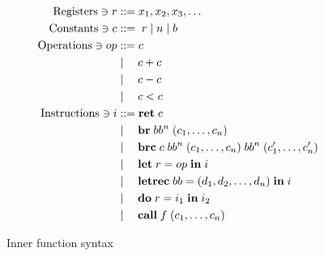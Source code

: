 \documentclass[a4paper, oneside, 10pt, draft]{memoir}
\begin{document}
\newcommand{\registers}{\mathrm{Registers}}
\newcommand{\constants}{\mathrm{Constants}}
\newcommand{\operations}{\mathrm{Operations}}
\newcommand{\instructions}{\mathrm{Instructions}}
\newcommand{\iret}[1]{\mathbf{ret} \; #1}

\newcommand{\ibr}[2]{\mathbf{br} \; #1 \; #2}
\newcommand{\ibrc}[5]{\mathbf{brc} \; #1 \; #2 \; #3 \; #4 \; #5}
\newcommand{\ilet}[3]{\mathbf{let} \; #1 = #2 \; \mathbf{in} \; #3}
\newcommand{\iletrec}[3]{\mathbf{letrec} \; #1 = #2 \; \mathbf{in} \; #3}
\newcommand{\ido}[3]{\mathbf{do} \; #1 = #2 \; \mathbf{in} \; #3}
\newcommand{\icall}[2]{\mathbf{call} \; #1 \; #2}
\begin{figure}
  \begin{align*}
    \registers \ni r & ::= x_1, x_2, x_3, \dotsc\\
    \constants \ni c & ::= \; r \bor \nat \bor \bool \\
    \operations \ni op & ::= c \\
                       & \bor \quad c + c \\
                       & \bor \quad c - c \\
                       & \bor \quad c < c \\
   \instructions \ni i & ::= \iret{c} \\
                       & \bor \quad \ibr{bb^n}{(c_1, \dotsc, c_n)} \\
                       & \bor \quad \ibrc{c}{bb^n}{(c_1, \dotsc, c_n)}{bb^n}{(c'_1, \dotsc, c'_n)}\\
                       & \bor \quad \ilet{r}{op}{i} \\
                       & \bor \quad \iletrec{bb}{(d_1, d_2, \dotsc, d_n)}{i} \\
                       & \bor \quad \ido{r}{i_1}{i_2}\\
                       & \bor \quad \icall{f}{(c_1, \dotsc, c_n)}
  \end{align*}
  \caption{Inner function syntax}
  \label{fig:inner-syntax}
\end{figure}
\end{document}
